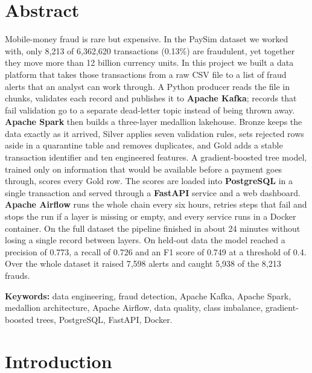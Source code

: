 \documentclass[11pt,a4paper]{article}
\begin{document}
\section*{Abstract}
Mobile-money fraud is rare but expensive. In the PaySim dataset we worked with,
only 8,213 of 6,362,620 transactions (0.13\%) are fraudulent, yet together they
move more than 12 billion currency units. In this project we built a data
platform that takes those transactions from a raw CSV file to a list of fraud
alerts that an analyst can work through. A Python producer reads the file in
chunks, validates each record and publishes it to \textbf{Apache Kafka}; records
that fail validation go to a separate dead-letter topic instead of being thrown
away. \textbf{Apache Spark} then builds a three-layer medallion lakehouse. Bronze
keeps the data exactly as it arrived, Silver applies seven validation rules, sets
rejected rows aside in a quarantine table and removes duplicates, and Gold adds a
stable transaction identifier and ten engineered features. A gradient-boosted
tree model, trained only on information that would be available before a payment
goes through, scores every Gold row. The scores are loaded into
\textbf{PostgreSQL} in a single transaction and served through a \textbf{FastAPI}
service and a web dashboard. \textbf{Apache Airflow} runs the whole chain every
six hours, retries steps that fail and stops the run if a layer is missing or
empty, and every service runs in a Docker container. On the full dataset the
pipeline finished in about 24 minutes without losing a single record between
layers. On held-out data the model reached a precision of 0.773, a recall of
0.726 and an F1 score of 0.749 at a threshold of 0.4. Over the whole dataset it
raised 7,598 alerts and caught 5,938 of the 8,213 frauds.

\vspace{0.4cm}
\noindent\textbf{Keywords:} data engineering, fraud detection, Apache Kafka,
Apache Spark, medallion architecture, Apache Airflow, data quality, class
imbalance, gradient-boosted trees, PostgreSQL, FastAPI, Docker.

\clearpage
\tableofcontents
\clearpage
\listoffigures
\listoftables
\clearpage

\setcounter{page}{1}

\section{Introduction}
\end{document}

